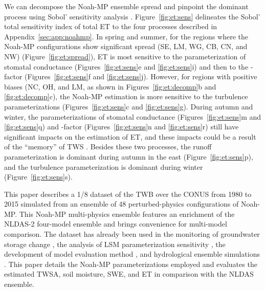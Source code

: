 \documentclass[essd, manuscript]{copernicus}
\begin{document}
We can decompose the Noah-MP ensemble spread and pinpoint the dominant process using Sobol' sensitivity analysis \citep{zheng2019WRR}. Figure~\ref{fig:et:sens} delineates the Sobol' total sensitivity index of total ET to the four processes described in Appendix~\ref{sec:app:noahmp}. In spring and summer, for the regions where the Noah-MP configurations show significant spread (SE, LM, WG, CB, CN, and NW) (Figure~\ref{fig:et:spread}), ET is most sensitive to the parameterization of stomatal conductance (Figures~\ref{fig:et:sens}e and \ref{fig:et:sens}i) and then to the \beta{}-factor (Figures~\ref{fig:et:sens}f and \ref{fig:et:sens}j). However, for regions with positive biases (NC, OH, and LM, as shown in Figures~\ref{fig:et:decomp}b and \ref{fig:et:decomp}c), the Noah-MP estimation is more sensitive to the turbulence parameterizations (Figures~\ref{fig:et:sens}c and \ref{fig:et:sens}g). During autumn and winter, the parameterizations of stomatal conductance (Figures~\ref{fig:et:sens}m and \ref{fig:et:sens}q) and \beta{}-factor (Figures~\ref{fig:et:sens}n and \ref{fig:et:sens}r) still have significant impacts on the estimation of ET, and these impacts could be a result of the ``memory'' of TWS \citep{zheng2019WRR}. Besides these two processes, the runoff parameterization is dominant during autumn in the east (Figure~\ref{fig:et:sens}p), and the turbulence parameterization is dominant during winter (Figure~\ref{fig:et:sens}s).

\label{sec:availability}

\conclusions{}\label{sec:conclusions}

This paper describes a 1/8\degree{} dataset of the TWB over the CONUS from 1980 to 2015 simulated from an ensemble of 48 perturbed-physics configurations of Noah-MP\@. This Noah-MP multi-physics ensemble features an enrichment of the NLDAS-2 four-model ensemble and brings convenience for multi-model comparison. The dataset has already been used in the monitoring of groundwater storage change \citep{rateb2020WRR}, the analysis of LSM parameterization sensitivity \citep{zheng2019WRR}, the development of model evaluation method \citep{zheng2020JAMES}, and hydrological ensemble simulations \citep{fei2021WRR}. This paper details the Noah-MP parameterizations employed and evaluates the estimated TWSA, soil moisture, SWE, and ET in comparison with the NLDAS ensemble.
\end{document}
